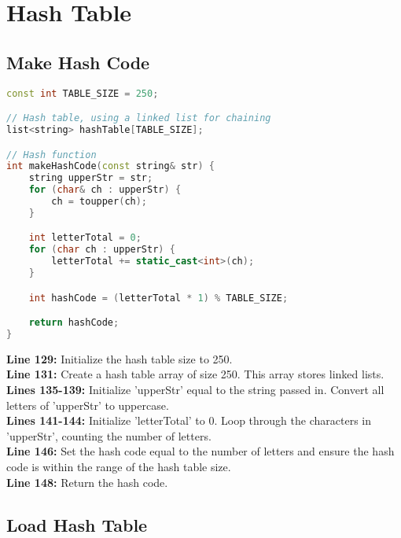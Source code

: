 \documentclass[letterpaper, 10pt,DIV=13]{scrartcl}
\numberwithin{equation}{section} %
\numberwithin{figure}{section} %
\numberwithin{table}{section} %
\begin{document}
\pagebreak

\section{Hash Table}
\subsection{Make Hash Code}

\begin{linenumbers}
\begin{lstlisting}[language=C++, caption={Make Hash Code}, label={code:example}]
const int TABLE_SIZE = 250;

// Hash table, using a linked list for chaining
list<string> hashTable[TABLE_SIZE];

// Hash function
int makeHashCode(const string& str) {
    string upperStr = str;
    for (char& ch : upperStr) {
        ch = toupper(ch);
    }

    int letterTotal = 0;
    for (char ch : upperStr) {
        letterTotal += static_cast<int>(ch);
    }

    int hashCode = (letterTotal * 1) % TABLE_SIZE;

    return hashCode;
}
\end{lstlisting}
\end{linenumbers}
\nolinenumbers

\textbf{Line 129:} Initialize the hash table size to 250. \\
\textbf{Line 131:} Create a hash table array of size 250. This array stores linked lists. \\
\textbf{Lines 135-139:} Initialize 'upperStr' equal to the string passed in. Convert all letters of 'upperStr' to uppercase. \\
\textbf{Lines 141-144:} Initialize 'letterTotal' to 0. Loop through the characters in 'upperStr', counting the number of letters. \\
\textbf{Line 146:} Set the hash code equal to the number of letters and ensure the hash code is within the range of the hash table size. \\
\textbf{Line 148:} Return the hash code. \\


\subsection{Load Hash Table}
\end{document}
